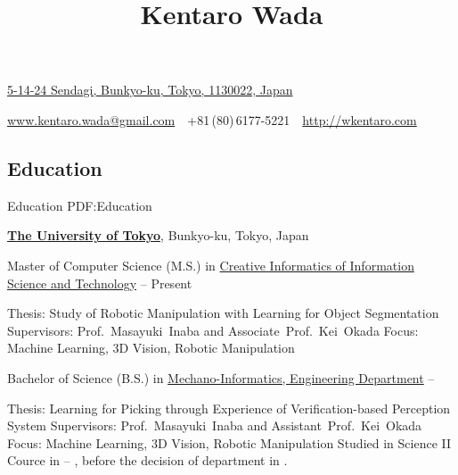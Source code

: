 \documentclass[letterpaper,MMMyyyy,nonstop]{simpleresumecv}
\newcommand{\CVAuthor}{Kentaro Wada}
\newcommand{\CVWebpage}{http://wkentaro.com}
\begin{document}

\title{\CVAuthor}

\begin{subtitle}
\href{https://www.google.co.jp/maps/place/5+Chome-14-24+Sendagi,+Bunky\%\%C5\%8D-ku,+T\%C5\%8Dky\%C5\%8D-to+113-0022/@35.7256436,139.7565051,17z/data=!3m1!4b1!4m5!3m4!1s0x60188dcec1ae4043:0x8a34261552288e81!8m2!3d35.7256436!4d139.7586938?hl=en}
{5-14-24 Sendagi, Bunkyo-ku, Tokyo, 1130022, Japan}
\par
\href{mailto:www.kentaro.wada@gmail.com}
{www.kentaro.wada@gmail.com}
\,\SubBulletSymbol\,
+81\,(80)\,6177-5221
\,\SubBulletSymbol\,
\href{\CVWebpage}
{\CVWebpage}
\end{subtitle}

\begin{body}


\section
{Education}
{Education}
{PDF:Education}

\href{http://www.u-tokyo.ac.jp/en/index.html}
{\textbf{The University of Tokyo}},
Bunkyo-ku, Tokyo, Japan

\GapNoBreak
\BulletItem
Master of Computer Science (M.S.) in
\href{http://www.i.u-tokyo.ac.jp/edu/course/ci/aim_e.shtml}
{Creative Informatics of Information Science and Technology}
\hfill
{} --
Present
\begin{detail}
\SubBulletItem
Thesis:
Study of Robotic Manipulation with Learning for Object Segmentation
\SubBulletItem
Supervisors:
Prof.~Masayuki~Inaba and Associate~Prof.~Kei~Okada
\SubBulletItem
Focus:
Machine Learning, 3D Vision, Robotic Manipulation
\end{detail}

\GapNoBreak
\BulletItem
Bachelor of Science (B.S.) in
\href{http://www.kikaib.t.u-tokyo.ac.jp}
{Mechano-Informatics, Engineering Department}
\hfill
{} --
\begin{detail}
\SubBulletItem
Thesis:
Learning for Picking through Experience of Verification-based Perception System
\SubBulletItem
Supervisors:
Prof.~Masayuki~Inaba and Assistant~Prof.~Kei~Okada
\SubBulletItem
Focus:
Machine Learning, 3D Vision, Robotic Manipulation
\SubBulletItem
Studied in Science II Cource in  -- ,
before the decision of department in .
\end{detail}


\end{body}
\end{document}
